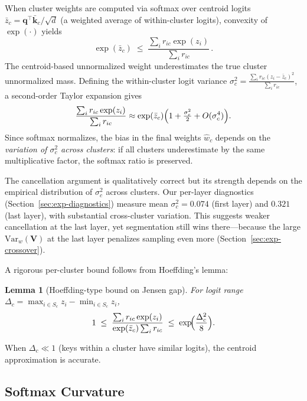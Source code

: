 \documentclass[11pt,a4paper]{article}
\newtheorem{lemma}[theorem]{Lemma}
\theoremstyle{definition}
\newcommand{\kk}{\mathbf{k}}
\newcommand{\qq}{\mathbf{q}}
\newcommand{\Var}{\mathrm{Var}}
\begin{document}
When cluster weights are computed via softmax over centroid logits
$\bar{z}_c = \qq^{\!\top}\bar{\kk}_c/\sqrt{d}$
(a weighted average of within-cluster logits), convexity of $\exp(\cdot)$
yields
\[
  \exp(\bar{z}_c)
  \;\le\;
  \frac{\sum_i r_{ic}\exp(z_i)}{\sum_i r_{ic}}\,.
\]
The centroid-based unnormalized weight underestimates the true cluster
unnormalized mass.  Defining the within-cluster logit variance
$\sigma_c^2 = \frac{\sum_i r_{ic}(z_i-\bar{z}_c)^2}{\sum_i r_{ic}}$,
a second-order Taylor expansion gives
\begin{equation}\label{eq:jensen-taylor}
  \frac{\sum_i r_{ic}\exp(z_i)}{\sum_i r_{ic}}
  \approx \exp(\bar{z}_c)\Bigl(1 + \tfrac{\sigma_c^2}{2}
    + O(\sigma_c^4)\Bigr).
\end{equation}
Since softmax normalizes, the bias in the final weights $\hat{w}_c$ depends
on the \emph{variation of $\sigma_c^2$ across clusters}: if all clusters
underestimate by the same multiplicative factor, the softmax ratio is
preserved.

\begin{researchnote}
The cancellation argument is qualitatively correct but its strength depends on
the empirical distribution of $\sigma_c^2$ across clusters.
Our per-layer diagnostics (Section~\ref{sec:exp-diagnostics}) measure mean
$\sigma_c^2 = 0.074$ (first layer) and $0.321$ (last layer), with substantial
cross-cluster variation.  This suggests weaker cancellation at the last layer,
yet segmentation still wins there---because the large $\Var_w(\mathbf{V})$ at
the last layer penalizes sampling even more (Section~\ref{sec:exp-crossover}).
\end{researchnote}

A rigorous per-cluster bound follows from Hoeffding's lemma:

\begin{lemma}[Hoeffding-type bound on Jensen gap]\label{lem:hoeffding}
For logit range $\Delta_c = \max_{i\in S_c}z_i - \min_{i\in S_c}z_i$,
\[
  1
  \;\le\;
  \frac{\sum_i r_{ic}\exp(z_i)}{\exp(\bar{z}_c)\sum_i r_{ic}}
  \;\le\;
  \exp\!\Bigl(\frac{\Delta_c^2}{8}\Bigr).
\]
\end{lemma}

When $\Delta_c\ll 1$ (keys within a cluster have similar logits), the centroid
approximation is accurate.

\subsection{Softmax Curvature}\label{sec:hessian}
\end{document}
